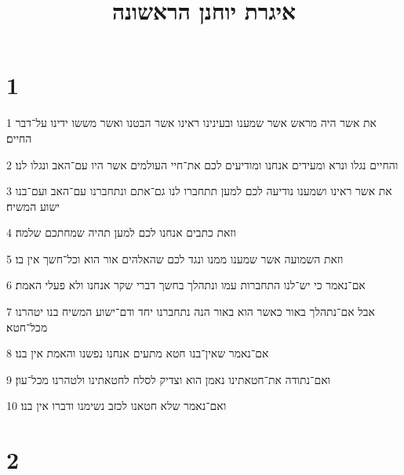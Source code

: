 

\title{איגרת יוחנן הראשונה}


\chapter{1}

\par 1 את אשר היה מראש אשר שמענו ובעינינו ראינו אשר הבטנו ואשר מששו ידינו על־דבר החיים׃
\par 2 והחיים נגלו ונרא ומעידים אנחנו ומודיעים לכם את־חיי העולמים אשר היו עם־האב ונגלו לנו׃
\par 3 את אשר ראינו ושמענו נודיעה לכם למען תתחברו לנו גם־אתם ונתחברנו עם־האב ועם־בנו ישוע המשיח׃
\par 4 וזאת כתבים אנחנו לכם למען תהיה שמחתכם שלמה׃
\par 5 וזאת השמועה אשר שמענו ממנו ונגד לכם שהאלהים אור הוא וכל־חשך אין בו׃
\par 6 אם־נאמר כי יש־לנו התחברות עמו ונתהלך בחשך דברי שקר אנחנו ולא פעלי האמת׃
\par 7 אבל אם־נתהלך באור כאשר הוא באור הנה נתחברנו יחד ודם־ישוע המשיח בנו יטהרנו מכל־חטא׃
\par 8 אם־נאמר שאין־בנו חטא מתעים אנחנו נפשנו והאמת אין בנו׃
\par 9 ואם־נתודה את־חטאתינו נאמן הוא וצדיק לסלח לחטאתינו ולטהרנו מכל־עון׃
\par 10 ואם־נאמר שלא חטאנו לכזב נשימנו ודברו אין בנו׃

\chapter{2}

